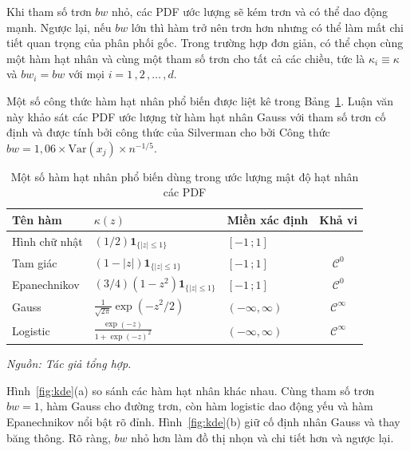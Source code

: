 \documentclass[a4paper,oneside]{book} %
\theoremstyle{plain}
\theoremstyle{plain}
\theoremstyle{nonumberplain}
\newcommand{\chy}[1]{\begin{remark}#1\end{remark}}
\begin{document}
\chy{Khi tham số trơn $bw$ nhỏ, các PDF ước lượng sẽ kém trơn và có thể dao động mạnh. Ngược lại, nếu $bw$ lớn thì hàm trở nên trơn hơn nhưng có thể làm mất chi tiết quan trọng của phân phối gốc. Trong trường hợp đơn giản, có thể chọn cùng một hàm hạt nhân và cùng một tham số trơn cho tất cả các chiều, tức là $\kappa_i \equiv \kappa$ và ${bw}_i = {bw}$ với mọi $i=1\,,2\,,\ldots\,,d$. }
	
	Một số công thức hàm hạt nhân phổ biến được liệt kê trong Bảng~\ref{tab:kernel}. Luận văn này khảo sát  các PDF ước lượng từ hàm hạt nhân Gauss với tham số trơn cố định và được tính bởi công thức của Silverman cho bởi Công thức $bw = 1{,}06 \times \mathrm{Var}(x_j) \times n^{-1/5}$.


\begin{table}
	\centering
	\caption{Một số hàm hạt nhân phổ biến dùng trong ước lượng mật độ hạt nhân các PDF}
	\label{tab:kernel}
	\centering\fontsize{11pt}{14pt}\selectfont
\begin{tabular*}{\columnwidth}{@{\extracolsep\fill}lllc@{\extracolsep\fill}} 
		\toprule
		\textbf{Tên hàm} & \textbf{$\kappa(z)$} & \textbf{Miền xác định} & \textbf{Khả vi}\\\midrule
		Hình chữ nhật &
		$ (1/2)\bm1_{\{|z| \leq 1\}}$ &
		$[-1\,; 1]$ &  \\
		Tam giác &
		$ (1 - |z|) \bm1_{\{|z| \leq 1\}}$ &
		$[-1\,; 1]$ & $\mathcal{C}^0$ \\
		Epanechnikov &
		$ (3/4)(1 - z^2) \bm1_{\{|z| \leq 1\}}$ &
		$[-1\,; 1]$ &  $\mathcal{C}^0$ \\
		Gauss &
		$ \frac{1}{\sqrt{2\pi}} \exp\left(-z^2/2\right)$ &
	$(-\infty,\infty)$ &  $\mathcal{C}^\infty$  \\
		Logistic &
		$\frac{\exp(-z)}{1 + \exp(-z)^2}$ &
		$(-\infty,\infty)$ & $\mathcal{C}^\infty$\\
		\bottomrule
	\end{tabular*}
	\begin{minipage}{\textwidth}
		\fontsize{11pt}{14pt}\selectfont\it
		Nguồn: Tác giả tổng hợp.
	\end{minipage}
\end{table}

Hình~\ref{fig:kde}(a) so sánh các hàm hạt nhân khác nhau. Cùng tham số trơn $bw=1$, hàm Gauss cho đường trơn, còn hàm logistic dao động yếu và hàm Epanechnikov nổi bật rõ đỉnh. Hình~\ref{fig:kde}(b) giữ cố định nhân Gauss và thay băng thông. Rõ ràng, $bw$ nhỏ hơn làm đồ thị nhọn và chi tiết hơn và ngược lại.
\end{document}
